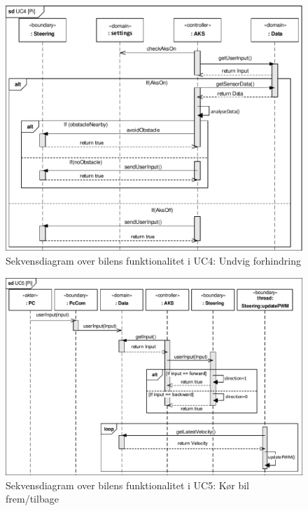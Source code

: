 \begin{figure}[h]
\centering
\includegraphics[]{../fig/diagrammer/bil/sd_uc4.pdf}
\caption{Sekvensdiagram over  bilens funktionalitet i UC4: Undvig forhindring}
\label{fig:sd_uc4_bil}
\end{figure}

\begin{landscape}

\begin{figure}[h]
\centering
\includegraphics[]{../fig/diagrammer/bil/sd_uc5.pdf}
\caption{Sekvensdiagram over  bilens funktionalitet i UC5: Kør bil frem/tilbage}
\label{fig:sd_uc5_bil}
\end{figure}

\end{landscape}

